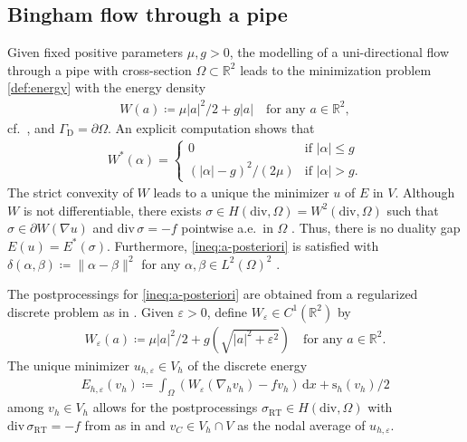 \documentclass[a4paper]{amsart}
\numberwithin{equation}{section}
\renewcommand{\d}[1]{\,\mathrm{d}#1}
\renewcommand{\div}{\mathrm{div}}
\newcommand{\RT}{\mathrm{RT}}
\newcommand{\s}{\mathrm{s}}
\theoremstyle{remark}
\begin{document}
\subsection{Bingham flow through a pipe}\label{sec:bingham}
Given fixed positive parameters $\mu, g > 0$, the modelling of a uni-directional flow through a pipe with cross-section $\Omega \subset \mathbb{R}^2$ leads to the minimization problem \eqref{def:energy} with the energy density
\begin{align*}
	W(a) \coloneqq \mu|a|^2/2 + g|a| \quad\text{for any } a \in \mathbb{R}^2,
\end{align*} 
cf.~\cite{DuvantLions1972,CarstenReddySchedensack2016}, and $\Gamma_\mathrm{D} = \partial \Omega$.
An explicit computation \cite{Tran2024} shows that
\begin{align*}
	W^*(\alpha) = \begin{cases}
		0 &\mbox{if } |\alpha| \leq g\\
		(|\alpha| - g)^2/(2 \mu) &\mbox{if } |\alpha| > g.
	\end{cases}
\end{align*}
The strict convexity of $W$ leads to a unique the minimizer $u$ of $E$ in $V$. Although $W$ is not differentiable, there exists $\sigma \in H(\div,\Omega) = W^2(\div,\Omega)$ such that $\sigma \in \partial W(\nabla u)$ and $\div\, \sigma = -f$ pointwise a.e.~in $\Omega$ \cite[Chapter II, Theorem 6.3]{Glowinski2008}.
Thus, there is no duality gap $E(u) = E^*(\sigma)$.
Furthermore, \eqref{ineq:a-posteriori} is satisfied with $\delta(\alpha,\beta) \coloneqq \|\alpha - \beta\|^2$ for any $\alpha, \beta \in L^2(\Omega)^2$ \cite[Lemma 1]{CarstenReddySchedensack2016}.

The postprocessings for \eqref{ineq:a-posteriori} are obtained from a regularized discrete problem as in \cite{CarstenReddySchedensack2016,Tran2024}. Given $\varepsilon > 0$, define $W_\varepsilon \in C^1(\mathbb{R}^2)$ by
\begin{align*}
	W_\varepsilon(a) \coloneqq \mu|a|^2/2 + g(\sqrt{|a|^2 + \varepsilon^2}) \quad\text{for any } a \in \mathbb{R}^2.
\end{align*}
The unique minimizer $u_{h,\varepsilon} \in V_h$ of the discrete energy
\begin{align*}
	E_{h,\varepsilon}(v_h) \coloneqq \int_\Omega (W_\varepsilon(\nabla_h v_h) - f v_h) \d{x} + \s_h(v_h)/2
\end{align*}
among $v_h \in V_h$
allows for the postprocessings $\sigma_\RT \in H(\div,\Omega)$ with $\div\,\sigma_\RT = -f$ from as in  and $v_C \in V_h \cap V$ as the nodal average of $u_{h,\varepsilon}$.
\end{document}
